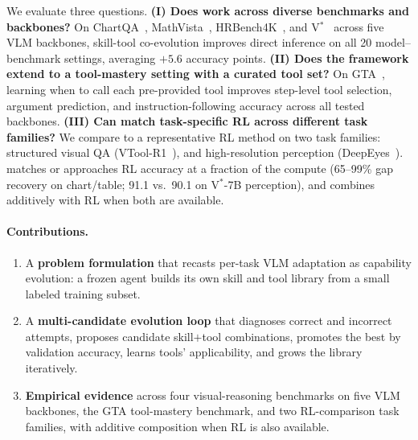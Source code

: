 We evaluate three questions.
\textbf{(I) Does \sysname{} work across diverse benchmarks and backbones?}
On ChartQA~\citep{DBLP:conf/acl/MasryLTJH22}, MathVista~\citep{DBLP:conf/iclr/LuBX0LH0CG024}, HRBench4K~\citep{DBLP:conf/aaai/Wang0ZZ000T25}, and V$^*$~\citep{DBLP:conf/cvpr/WuX24a} across five VLM backbones, skill-tool co-evolution
improves direct inference on all 20 model--benchmark settings, averaging $+5.6$ accuracy
points.
\textbf{(II) Does the framework extend to a tool-mastery setting with a curated tool set?}
On GTA~\citep{DBLP:conf/nips/WangMLZC0L24}, learning when to call each pre-provided tool
improves step-level tool selection, argument prediction, and instruction-following
accuracy across all tested backbones.
\textbf{(III) Can \sysname{} match task-specific RL across different task families?}
We compare \sysname{} to a representative RL method on two task families: structured
visual QA (VTool-R1~\citep{DBLP:journals/corr/abs-2505-19255}), and
high-resolution perception (DeepEyes~\citep{DBLP:journals/corr/abs-2505-14362}). \sysname{}
matches or approaches RL accuracy at a fraction of the compute (65--99\% gap recovery on
chart/table; 91.1 vs.\ 90.1 on V$^*$-7B perception), and combines additively with RL when
both are available.

\paragraph{Contributions.}
\begin{enumerate}[leftmargin=*, label=(\arabic*), noitemsep]
  \item A \textbf{problem formulation} that recasts per-task VLM adaptation as capability
        evolution: a frozen agent builds its own skill and tool library from a small
        labeled training subset.
  \item A \textbf{multi-candidate evolution loop} that diagnoses correct and incorrect
        attempts, proposes candidate skill$+$tool combinations, promotes the best by
        validation accuracy, learns tools' applicability, and grows the library
        iteratively.
  \item \textbf{Empirical evidence} across four visual-reasoning benchmarks on five VLM
        backbones, the GTA tool-mastery benchmark, and two RL-comparison task families,
        with additive composition when RL is also available.
\end{enumerate}
